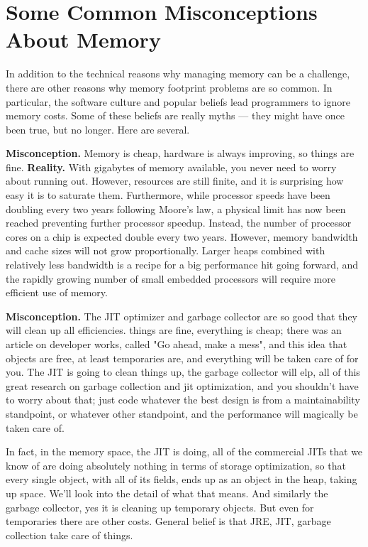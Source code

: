 \section{Some Common Misconceptions About Memory}

In addition to the technical reasons why managing memory can be a challenge, there
are other reasons why memory footprint problems are so common. In particular,
the software culture and popular beliefs lead programmers to ignore memory
costs. Some of these beliefs are really myths --- they might have once
been true, but no longer. Here are several.

\textbf{Misconception.} Memory is cheap, hardware is always improving, so
things are fine. \textbf{Reality.} With gigabytes of memory available, you never
need to worry about running out. However, resources are still finite, and it is surprising how easy it is to
saturate them. Furthermore, while processor speeds have been doubling every two
years following Moore's law, a physical limit has now been reached preventing further processor speedup. 
Instead, the number of processor cores on a chip is expected double every two years. However,
memory bandwidth and cache sizes will not grow proportionally. 
 Larger heaps combined with relatively less bandwidth is a recipe for a big performance hit going forward, 
 and the rapidly growing number of small embedded processors will require more
 efficient use of memory.

\textbf{Misconception.} The JIT optimizer and garbage collector are so good that
they will clean up all efficiencies. things are fine, everything is cheap; there was an
article on developer works, called "Go ahead, make a mess",  and this idea that objects are free, at least temporaries are,
 and everything will be taken care of for you. The JIT is going to clean things up, the garbage collector will elp, 
 all of this great research 
  on garbage collection and jit optimization, and you shouldn't have to worry about that; just code whatever the best design 
  is from a maintainability standpoint, or whatever other standpoint, and the performance will magically be taken care of.

In fact, in the memory space, the JIT is doing, all of the commercial JITs that we know of are doing absolutely nothing 
in terms of storage optimization, so that every single object, with all of its fields, ends up as an object in the heap, 
taking up space.  We'll look into the detail of what that means. And similarly the garbage collector, yes it is cleaning up 
temporary objects. But even for temporaries there are other costs.
General belief is that JRE, JIT, garbage collection take care of things.


